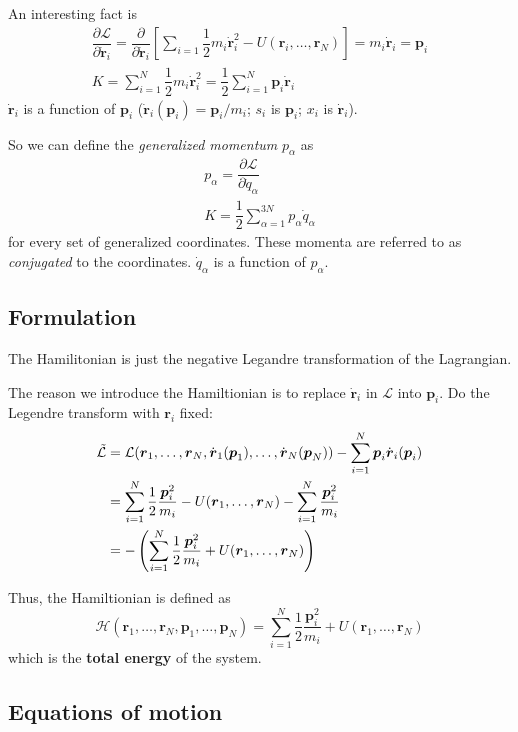 \documentclass[
  10pt,
  twoside,
  openany,
  b5paper, %
  colorscheme = bootstrap-v4, %
]{qyxf-book}
\newcommand{\p}[2]{\dfrac{\partial #1}{\partial #2}}
\newcommand{\vr}{\boldsymbol{r}}
\newcommand{\vp}{\boldsymbol{p}}
\newcommand{\dvr}{\dot{\vr}}
\newcommand{\half}{\dfrac{1}{2}}
\newcommand{\sumin}{\sum_{i=1}^N}
\newcommand{\suman}{\sum_{\alpha=1}^{3N}}
\newcommand{\lag}{\mathcal{L}} %
\newcommand{\ham}{\mathcal{H}} %
\begin{document}
An interesting fact is
\begin{gather}
	\p{\lag}{\dvr_i}=\p{}{\dvr_i}\left[\sum_{i=1}\half m_i\dvr_i^2-U(\vr_i,\dots,\vr_N)\right]=m_i\dvr_i=\vp_i\\
	K=\sumin\half m_i\dvr_i^2=\half\sumin\vp_i\dvr_i
\end{gather}
$\dvr_i$ is a function of $\vp_i$ ($\dvr_i(\vp_i)=\vp_i/m_i$; $s_i$ is $\vp_i$; $x_i$ is $\dvr_i$). 

So we can define the \textit{generalized momentum} $p_\alpha$ as
\begin{gather}
	p_\alpha=\p{\lag}{\dot{q}_\alpha}\\
	K=\half\suman p_\alpha\dot{q}_\alpha \label{eq:kinetic-general}
\end{gather}
for every set of generalized coordinates. These momenta are referred to as \textit{conjugated} to the coordinates. $\dot{q}_\alpha$ is a function of $p_\alpha$.

\subsection{Formulation}
The Hamilitonian is just the negative Legandre transformation of the Lagrangian. 

The reason we introduce the Hamiltionian is to replace $\dvr_i$ in $\lag$ into $\vp_i$. Do the Legendre transform with $\vr_i$ fixed:
\begin{align}
	\tilde{\lag}&=\lag(\vr_1,\dots,\vr_N,\dvr_1(\vp_1),\dots,\dvr_N(\vp_N))-\sumin \vp_i\dvr_i(\vp_i) \notag\\
	&=\sumin\half \dfrac{\vp_i^2}{m_i}-U(\vr_1,\dots,\vr_N)-\sumin \dfrac{\vp_i^2}{m_i} \notag\\
	&=-\left(\sumin\half \dfrac{\vp_i^2}{m_i}+U(\vr_1,\dots,\vr_N)\right)
\end{align}

Thus, the Hamiltionian is defined as
\begin{equation}
	\ham(\vr_1,\dots,\vr_N,\vp_1,\dots,\vp_N)=\sumin\half \dfrac{\vp_i^2}{m_i}+U(\vr_1,\dots,\vr_N)
\end{equation}
which is the \textbf{total energy} of the system.

\subsection{Equations of motion}
\end{document}
